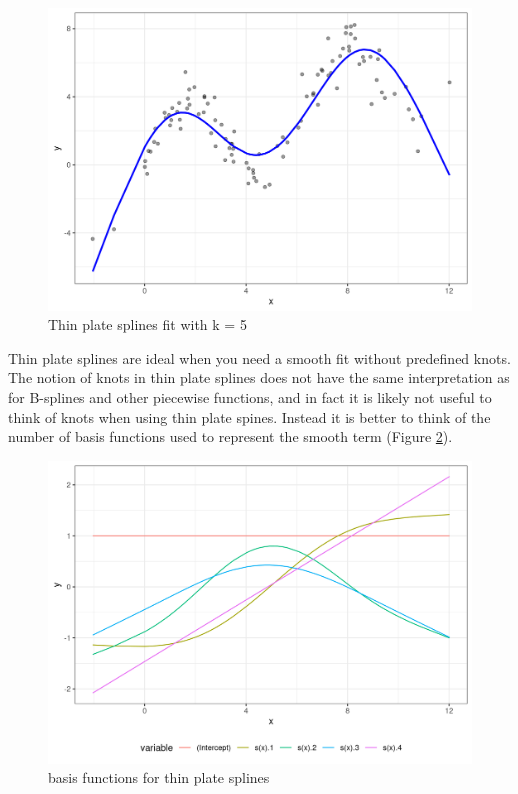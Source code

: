 \documentclass[
]{book}
\begin{document}
\begin{figure}
\centering
\includegraphics{_bookdown_files/_main_files/figure-html/tps-1.png}
\caption{\label{fig:tps}Thin plate splines fit with k = 5}
\end{figure}

Thin plate splines are ideal when you need a smooth fit without predefined knots. The notion of knots in thin plate splines does not have the same interpretation as for B-splines and other piecewise functions, and in fact it is likely not useful to think of knots when using thin plate spines. Instead it is better to think of the number of basis functions used to represent the smooth term (Figure \ref{fig:tpsbasis}).

\begin{figure}
\centering
\includegraphics{_bookdown_files/_main_files/figure-html/tpsbasis-1.png}
\caption{\label{fig:tpsbasis}basis functions for thin plate splines}
\end{figure}
\end{document}
